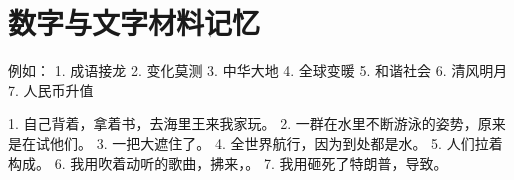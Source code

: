 \section{数字与文字材料记忆}

例如：
1. 成语接龙
2. 变化莫测
3. 中华大地
4. 全球变暖
5. 和谐社会
6. 清风明月
7. 人民币升值


1. 自己背着，拿着书，去海里王来我家玩。
2. 一群在水里不断游泳的姿势，原来是在试他们。
3. 一把大遮住了。
4. 全世界航行，因为到处都是水。
5. 人们拉着构成。
6. 我用吹着动听的歌曲，拂来，。
7. 我用砸死了特朗普，导致。



